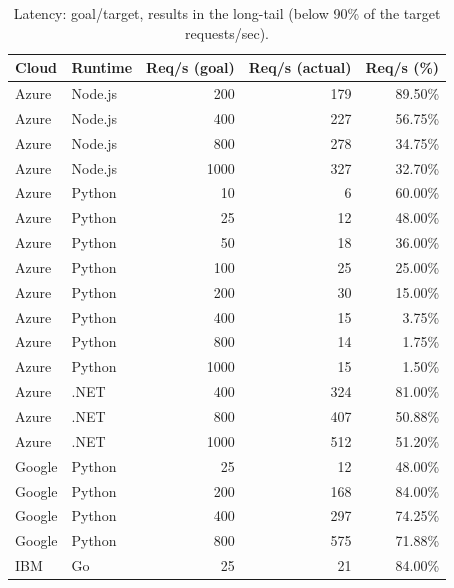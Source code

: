
\renewcommand{\arraystretch}{1.2}
\begin{table}[!t]
\setlength{\tabcolsep}{3pt}
\scriptsize
\centering
\caption{Latency: goal/target, results in the long-tail (below 90\% of the target requests/sec).}
\begin{tabular}{l|l|r|r|r} 
\rowcolor{gray!45}
\textbf{Cloud} & \textbf{Runtime} & \textbf{Req/s (goal)} & \textbf{Req/s (actual)} & \textbf{Req/s (\%)} \\ \hline
\rowcolor{gray!25}
Azure & Node.js & 200 & 179 & 89.50\% \\ 
Azure & Node.js & 400 & 227 & 56.75\% \\ 
Azure & Node.js & 800 & 278 & 34.75\% \\ 
Azure & Node.js & 1000 & 327 & 32.70\% \\
Azure & Python & 10 & 6 & 60.00\% \\  
Azure & Python & 25 & 12 & 48.00\% \\ 
Azure & Python & 50 & 18 & 36.00\% \\ 
Azure & Python & 100 & 25 & 25.00\% \\ 
Azure & Python & 200 & 30 & 15.00\% \\ 
Azure & Python & 400 & 15 & 3.75\% \\ 
Azure & Python & 800 & 14 & 1.75\% \\ 
Azure & Python & 1000 & 15 & 1.50\% \\
Azure & .NET & 400 & 324  & 81.00\% \\
Azure & .NET & 800 & 407 & 50.88\% \\ 
Azure & .NET & 1000 & 512 & 51.20\% \\ 
Google & Python & 25 & 12 & 48.00\% \\ 
Google & Python & 200 & 168 & 84.00\% \\ 
Google & Python & 400 & 297 & 74.25\% \\ 
Google & Python & 800 & 575 & 71.88\% \\ 
IBM & Go & 25 &  21 & 84.00\% \\ \hline
\end{tabular}
\label{table:rps}
\vspace{-15pt}
\end{table}

